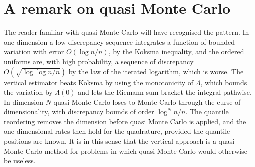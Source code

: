 \section{A remark on quasi Monte Carlo}

The reader familiar with quasi Monte Carlo will have recognised the pattern. In one dimension a low discrepancy sequence integrates a function of bounded variation with error $O(\log n / n)$, by the Koksma inequality, and the ordered uniforms are, with high probability, a sequence of discrepancy $O(\sqrt{\log \log n / n})$ by the law of the iterated logarithm, which is worse. The vertical estimator beats Koksma by using the monotonicity of $\Lambda$, which bounds the variation by $\Lambda(0)$ and lets the Riemann sum bracket the integral pathwise. In dimension $N$ quasi Monte Carlo loses to Monte Carlo through the curse of dimensionality, with discrepancy bounds of order $\log^N n / n$. The quantile reordering removes the dimension before quasi Monte Carlo is applied, and the one dimensional rates then hold for the quadrature, provided the quantile positions are known. It is in this sense that the vertical approach is a quasi Monte Carlo method for problems in which quasi Monte Carlo would otherwise be useless.
